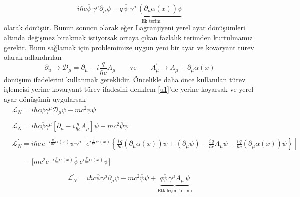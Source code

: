\begin{equation} \label{u3}
i\hbar c \overline{\psi}\,\gamma^{\mu}\partial_{\mu} \psi - \underbrace{q\,\overline{\psi}\,\gamma^{\mu}\, ( \partial_{\mu}\alpha(x) )\psi}_{\textrm{Ek terim}}
\end{equation}
olarak dönüşür. Bunun sonucu olarak eğer Lagranjiyeni yerel ayar dönüşümleri altında değişmez bırakmak istiyorsak ortaya çıkan fazlalık terimden kurtulmamız gerekir. Bunu sağlamak için problemimize uygun yeni bir ayar ve kovaryant türev olarak adlandırılan 
\begin{equation} \label{uu:4}
\partial_{u} \to \mathcal{D}_{\mu} = \partial_{\mu} - i \frac{q}{\hbar c} A_{\mu} \qquad \textrm{ve} \qquad A^{'}_{\mu} \to A_{\mu} + \partial_{\mu} \alpha(x)
\end{equation}
dönüşüm ifadelerini kullanmak gereklidir. Öncelikle daha önce kullanılan türev işlemcisi yerine kovaryant türev ifadesini denklem \eqref{u1}'de yerine koyarsak ve yerel ayar dönüşümü uygularsak
\begin{equation*}
\begin{aligned}
&\mathcal{L}_{N} = i\hbar c\overline{\psi}\gamma^{\mu}\mathcal{D}_{\mu} \psi  - mc{^2}\overline{\psi}\psi \\
\\
& \mathcal{L}_{N}= i\hbar c\overline{\psi}\gamma^{\mu}\left[ \partial_{\mu} - i \frac{q}{\hbar c} A_{\mu}\right] \psi  - mc{^2}\overline{\psi}\psi\\
\\ 
& \mathcal{L}_{N}^{'} =  i\hbar c\, e^{-i\frac{q}{\hbar c}\alpha(x)} \overline{\psi} \gamma^{\mu} \left[ e^{i \frac{q}{\hbar c} \alpha(x)}\left\lbrace 
\frac{i\,q}{\hbar c}( \partial_{\mu}\alpha(x))\psi +  ( \partial_{\mu} \psi) - \frac{i\,q}{\hbar c} A_{\mu}\psi 
 - \frac{i\,q}{\hbar c}( \partial_{\mu}\alpha(x))\psi \right\rbrace \right] \\
\\
&\quad\;\; - \bigg[ m c^{2}e^{-i\frac{q}{\hbar c}\alpha(x)} \overline{\psi}\, e^{i \frac{q}{\hbar c} \alpha(x)} \psi  \bigg] \\
\\
\end{aligned}
\end{equation*}
\begin{equation} \label{u5}
\mathcal{L}_{N}^{'} = i\hbar c\overline{\psi}\gamma^{\mu}\partial_{\mu} \psi - mc{^2}\overline{\psi}\psi + \underbrace{ q \overline{\psi}\,\gamma^{\mu} A_{\mu}\,\psi }_{\textrm{Etkileşim terimi}}
\end{equation}
